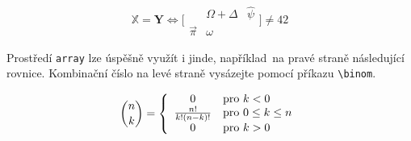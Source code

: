 \documentclass[11pt, a4paper, twocolumn]{article}
\theoremstyle{definition}
\begin{document}
$$ \mathbb{X} = \textbf{Y} \iff \bigg[
\begin{array}{ccc}
     & \Omega + \Delta & \hat{\psi} \\
    \vec{\pi} & \omega & 
\end{array}
\bigg] \neq 42
$$

Prostředí \texttt{array} lze úspěšně využít i jinde, například~na pravé straně následující rovnice. Kombinační číslo na levé straně vysázejte pomocí příkazu \texttt{\textbackslash binom}.

$$
\binom{n}{k} = \left\{
\begin{array}{c l}
     0 & \text{pro } k<0 \\
     \frac{n!}{k!(n-k)!} & \text{pro } 0 \leq k \leq n \\
     0 & \text{pro } k>0
\end{array} \right. $$
\end{document}
